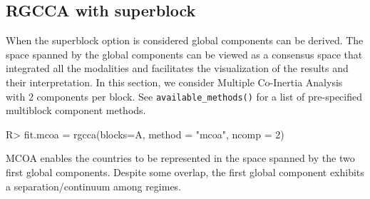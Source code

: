 \documentclass[
]{jss}
\begin{document}
\normalsize

\hypertarget{rgcca-with-superblock}{%
\subsection{RGCCA with superblock}\label{rgcca-with-superblock}}

When the superblock option is considered global components can be
derived. The space spanned by the global components can be viewed as a
consensus space that integrated all the modalities and facilitates the
visualization of the results and their interpretation. In this section,
we consider Multiple Co-Inertia Analysis \cite{Hanafi2006} with \(2\)
components per block. See \texttt{available\_methods()} for a list of
pre-specified multiblock component methods.

\footnotesize

\begin{CodeChunk}
\begin{CodeInput}
R> fit.mcoa = rgcca(blocks=A, method = "mcoa", ncomp = 2)
\end{CodeInput}
\end{CodeChunk}

\normalsize

MCOA enables the countries to be represented in the space spanned by the
two first global components. Despite some overlap, the first global
component exhibits a separation/continuum among regimes.

\footnotesize
\end{document}
